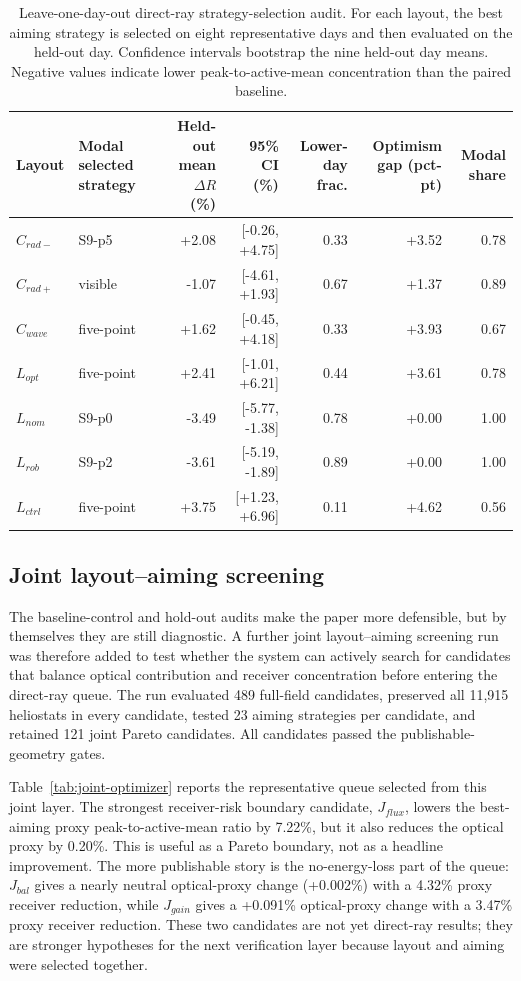 \documentclass[final,3p,times]{elsarticle}
\begin{document}
\begin{table}[t]
\centering
\caption{Leave-one-day-out direct-ray strategy-selection audit. For each layout, the best aiming strategy is selected on eight representative days and then evaluated on the held-out day. Confidence intervals bootstrap the nine held-out day means. Negative values indicate lower peak-to-active-mean concentration than the paired baseline.}
\label{tab:baseline-direct-holdout}
\scriptsize
\begin{tabular*}{\textwidth}{@{\extracolsep{\fill}}llrrrrr@{}}
\toprule
Layout & Modal selected strategy & Held-out mean $\Delta R$ (\%) & 95\% CI (\%) & Lower-day frac. & Optimism gap (pct-pt) & Modal share \\
\midrule
$C_{rad-}$ & S9-p5 & +2.08 & [-0.26, +4.75] & 0.33 & +3.52 & 0.78 \\
$C_{rad+}$ & visible & -1.07 & [-4.61, +1.93] & 0.67 & +1.37 & 0.89 \\
$C_{wave}$ & five-point & +1.62 & [-0.45, +4.18] & 0.33 & +3.93 & 0.67 \\
$L_{opt}$ & five-point & +2.41 & [-1.01, +6.21] & 0.44 & +3.61 & 0.78 \\
$L_{nom}$ & S9-p0 & -3.49 & [-5.77, -1.38] & 0.78 & +0.00 & 1.00 \\
$L_{rob}$ & S9-p2 & -3.61 & [-5.19, -1.89] & 0.89 & +0.00 & 1.00 \\
$L_{ctrl}$ & five-point & +3.75 & [+1.23, +6.96] & 0.11 & +4.62 & 0.56 \\
\bottomrule
\end{tabular*}
\end{table}

\subsection{Joint layout--aiming screening}
The baseline-control and hold-out audits make the paper more defensible, but by themselves they are still diagnostic. A further joint layout--aiming screening run was therefore added to test whether the system can actively search for candidates that balance optical contribution and receiver concentration before entering the direct-ray queue. The run evaluated 489 full-field candidates, preserved all 11,915 heliostats in every candidate, tested 23 aiming strategies per candidate, and retained 121 joint Pareto candidates. All candidates passed the publishable-geometry gates.

Table~\ref{tab:joint-optimizer} reports the representative queue selected from this joint layer. The strongest receiver-risk boundary candidate, $J_{flux}$, lowers the best-aiming proxy peak-to-active-mean ratio by 7.22\%, but it also reduces the optical proxy by 0.20\%. This is useful as a Pareto boundary, not as a headline improvement. The more publishable story is the no-energy-loss part of the queue: $J_{bal}$ gives a nearly neutral optical-proxy change (+0.002\%) with a 4.32\% proxy receiver reduction, while $J_{gain}$ gives a +0.091\% optical-proxy change with a 3.47\% proxy receiver reduction. These two candidates are not yet direct-ray results; they are stronger hypotheses for the next verification layer because layout and aiming were selected together.
\end{document}
